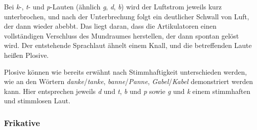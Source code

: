 
Bei \textit{k}-, \textit{t}- und \textit{p}-Lauten (ähnlich \textit{g}, \textit{d}, \textit{b}) wird der Luftstrom jeweils kurz unterbrochen, und nach der Unterbrechung folgt ein deutlicher Schwall von Luft, der dann wieder abebbt.
Das liegt daran, dass die Artikulatoren einen vollständigen Verschluss des Mundraumes herstellen, der dann spontan gelöst wird.
Der entstehende Sprachlaut ähnelt einem Knall, und die betreffenden Laute heißen Plosive.


Plosive können wie bereits erwähnt nach Stimmhaftigkeit unterschieden werden, wie an den Wörtern \textit{danke}/\textit{tanke}, \textit{banne}/\textit{Panne}, \textit{Gabel}/\textit{Kabel} demonstriert werden kann.
Hier entsprechen jeweils \textit{d} und \textit{t}, \textit{b} und \textit{p} sowie \textit{g} und \textit{k} einem stimmhaften und stimmlosen Laut.

\subsubsection{Frikative}

